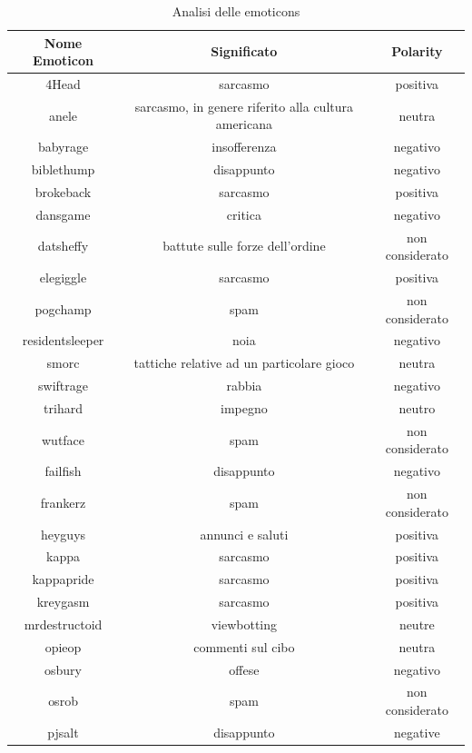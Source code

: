 \documentclass[a4paper,12pt,openright,twoside]{report}
\theoremstyle{definition}
\begin{document}
\begin{table}[h]
\begin{center}
\begin{tabular}{|c|c|c|}
\hline
Nome Emoticon & Significato & Polarity \\
\hline
\hline
4Head & sarcasmo & positiva \\
\hline
anele & sarcasmo, in genere riferito alla cultura americana & neutra \\
\hline
babyrage & insofferenza & negativo \\
\hline
biblethump & disappunto & negativo \\
\hline
brokeback & sarcasmo & positiva \\
\hline
dansgame & critica & negativo \\
\hline
datsheffy & battute sulle forze dell'ordine & non considerato \\
\hline
elegiggle & sarcasmo & positiva \\
\hline
pogchamp & spam & non considerato \\
\hline
residentsleeper & noia & negativo \\
\hline
smorc & tattiche relative ad un particolare gioco & neutra \\
\hline
swiftrage & rabbia & negativo \\
\hline
trihard & impegno &  neutro \\
\hline
wutface & spam & non considerato \\
\hline
failfish & disappunto & negativo \\
\hline
frankerz & spam & non considerato \\
\hline
heyguys & annunci e saluti & positiva \\
\hline
kappa & sarcasmo & positiva \\
\hline
kappapride & sarcasmo & positiva \\
\hline
kreygasm & sarcasmo & positiva \\
\hline
mrdestructoid & viewbotting & neutre \\
\hline
opieop & commenti sul cibo & neutra \\
\hline
osbury & offese & negativo \\
\hline
osrob & spam & non considerato \\
\hline
pjsalt & disappunto & negative \\
\hline
\end{tabular}
\end{center}
\caption{Analisi delle emoticons}
\label{tab:emoticons1}
\end{table}
\end{document}

